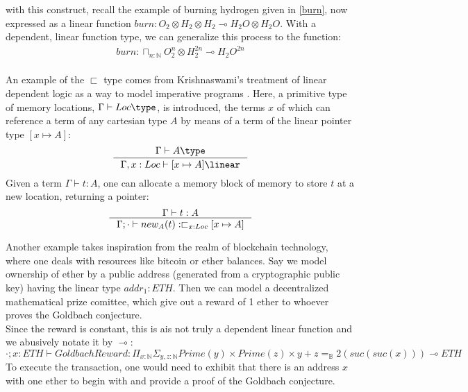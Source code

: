 with this construct, recall the example of burning hydrogen given in \ref{burn}, now expressed as a linear function $burn : O_2 \otimes H_2 \otimes H_2 \multimap H_2O \otimes H_2O$. With a dependent, linear function type, we can generalize this process to the function:
\[
  \begin{split}
  burn : \sqcap_{n : \mathbb{N}}O_2^n \otimes H_2^{2n} \multimap H_2O^{2n}
  \end{split}
\]
\\
An example of the $\sqsubset$ type comes from Krishnaswami's treatment of linear dependent logic as a way to model imperative programs \cite{krishnaswami}. Here, a primitive type of memory locations, $\Gamma \vdash Loc \type$, is introduced, the terms $x$ of which can reference a term of any cartesian type $A$ by means of a term of the linear pointer type $[x \mapsto A]$:
\[ 
  \inference{\Gamma \vdash A \type}
  {\Gamma, x : Loc \vdash [x \mapsto A] \linear}
\]
Given a term $\Gamma \vdash t : A$, one can allocate a memory block of memory to store $t$ at a new location, returning a pointer:
\[
  \inference{\Gamma \vdash t : A}
  {\Gamma; \cdot \vdash new_A (t) : \sqsubset_{x : Loc} [x \mapsto A]}
\]


Another example takes inspiration from the realm of blockchain technology, where one deals with resources like bitcoin or ether balances. Say we model ownership of ether by a public address (generated from a cryptographic public key) having the linear type $addr_1 : ETH$. Then we can model a decentralized  mathematical prize comittee, which give out a reward of 1 ether to whoever proves the Goldbach conjecture.\\
Since the reward is constant, this is ais not truly a dependent linear function and we abusively notate it by $\multimap$:
\[
\cdot; x : ETH \vdash GoldbachReward: \Pi_{x : \mathbb{N}}\Sigma_{y, z : \mathbb{N}}Prime(y) \times Prime(z) \times y + z =_{\mathbb{B}} 2(suc(suc(x))) \multimap ETH
\]
To execute the transaction, one would need to exhibit that there is an address $x$ with one ether to begin with and provide a proof of the Goldbach conjecture.\\
